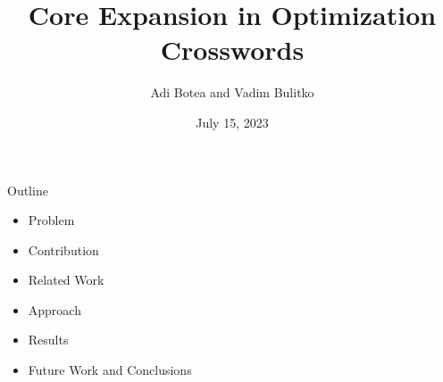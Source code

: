 \documentclass[aspectratio=169,usenames,dvipsnames]{beamer}
\newcommand{\bei}{\begin{itemize}}
\newcommand{\eei}{\end{itemize}}
\newcommand{\ie}{\item}
\numberwithin{equation}{section}
\numberwithin{theorem}{section}
\numberwithin{lem}{section}
\numberwithin{df}{section}
\begin{document}
\title{Core Expansion in Optimization Crosswords}
\author{Adi Botea and Vadim Bulitko}

\date{July 15, 2023}

\frame{\titlepage} 


\begin{frame}{Outline}

\bei

\ie Problem

\bigskip

\ie Contribution

\bigskip

\ie Related Work

\bigskip

\ie Approach

\bigskip

\ie Results

\bigskip

\ie Future Work and Conclusions

\eei

\end{frame}

\end{document}
